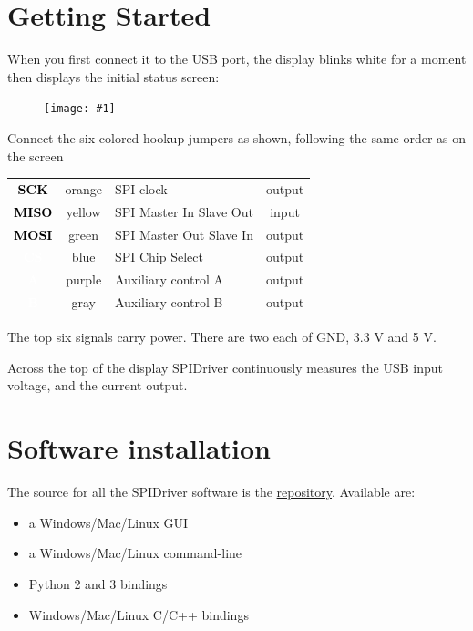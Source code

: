 \documentclass{article}
\newcommand{\png}[1]{
\begin{figure}[H]
\begin{center}
\texttt{[image: \#1]}
\end{center}
\end{figure}
}
\newcommand{\gap}{\vspace{10pt}}
\begin{document}
\newpage
\section{Getting Started}

When you first connect it to the USB port, the display blinks white for a moment
then displays the initial status screen:

\png{img/spidriver/spi_driver_cold}

Connect the six colored hookup jumpers as shown,
following the same order as on the screen

\gap
\begin{center}
\begin{tabular}{cclc}
\hline
\cellcolor{orange} \textcolor{black}{\textbf{SCK}}  & orange & SPI clock               & output \\
\cellcolor{yellow} \textcolor{black}{\textbf{MISO}} & yellow & SPI Master In Slave Out & input  \\
\cellcolor{green} \textcolor{black}{\textbf{MOSI}}  & green  & SPI Master Out Slave In & output \\
\cellcolor{blue} \textcolor{white}{\textbf{CS}}     & blue   & SPI Chip Select         & output \\
\cellcolor{purple} \textcolor{white}{\textbf{A}}    & purple & Auxiliary control A     & output \\
\cellcolor{gray} \textcolor{white}{\textbf{B}}      & gray   & Auxiliary control B     & output \\
\hline
\end{tabular}
\end{center}
\gap

The top six signals carry power. There are two each of GND, 3.3 V and 5 V.

Across the top of the display SPIDriver continuously measures the USB input voltage,
and the current output.

\newpage
\section{Software installation}

The source for all the SPIDriver software is the
\href{https://github.com/jamesbowman/spidriver}{repository}.
Available are:

\begin{itemize}
\item a Windows/Mac/Linux GUI
\item a Windows/Mac/Linux command-line
\item Python 2 and 3 bindings
\item Windows/Mac/Linux C/C++ bindings
\end{itemize}
\end{document}
